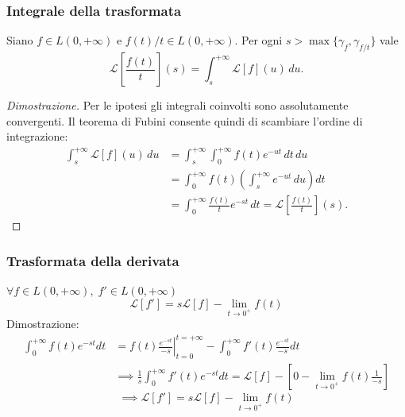             \subsubsection{Integrale della trasformata}
                Siano $f\in L(0,+\infty)$ e
                $f(t)/t\in L(0,+\infty)$. Per ogni
                $s>\max\{\gamma_f,\gamma_{f/t}\}$ vale
                \[
                    \mathcal{L}\left[\frac{f(t)}{t}\right](s)
                    =\int_s^{+\infty}\mathcal{L}[f](u)\,du.
                \]
                \begin{proof}[Dimostrazione]
                    Per le ipotesi gli integrali coinvolti sono
                    assolutamente convergenti. Il teorema di Fubini
                    consente quindi di scambiare l'ordine di integrazione:
                    \begin{align*}
                        \int_s^{+\infty}\mathcal{L}[f](u)\,du
                        &=\int_s^{+\infty}\int_0^{+\infty}
                        f(t)e^{-ut}\,dt\,du \\
                        &=\int_0^{+\infty}f(t)
                        \left(\int_s^{+\infty}e^{-ut}\,du\right)dt \\
                        &=\int_0^{+\infty}\frac{f(t)}{t}e^{-st}\,dt
                        =\mathcal{L}\left[\frac{f(t)}{t}\right](s).
                    \end{align*}
                \end{proof}

            \subsubsection{Trasformata della derivata}
                $\forall f \in L(0, +\infty), \; f' \in L(0, +\infty)$
                \[
                    \mathcal{L}[f'] = s\mathcal{L}[f] - \lim_{t \rightarrow 0^{+}} f(t)
                \]
                Dimostrazione:
                \[
                    \begin{aligned}
                        \int_{0}^{+\infty} f(t) e^{-st} dt
                        &= \left. f(t) \frac{e^{-st}}{-s} \right|_{t = 0}^{t = +\infty}
                        - \int_{0}^{+\infty} f'(t) \frac{e^{-st}}{-s} dt \\
                        &\implies \frac{1}{s} \int_{0}^{+\infty} f'(t) e^{-st} dt
                        = \mathcal{L}[f] - \left[ 0 - \lim_{t \rightarrow 0^{+}} f(t) \frac{1}{-s} \right]
                    \end{aligned}
                \]
                \[
                    \implies \mathcal{L}[f'] = s\mathcal{L}[f] - \lim_{t \rightarrow 0^{+}} f(t)
                \]

